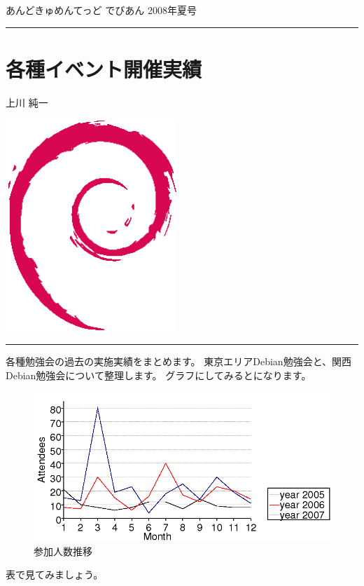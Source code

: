 \documentclass[mingoth,a4paper]{jsarticle}
\renewcommand{\dancersection}[2]{%
\newpage
あんどきゅめんてっど でびあん 2008年夏号
%
\vspace{0.1mm}\\
{\color{dancerlightblue}\rule{\hsize}{2mm}}

%
%
\begin{minipage}[t]{0.6\hsize}
\color{dancerdarkblue}
\vspace{1cm}
\section{#1}
\hfill{}#2\\
\end{minipage}
\begin{minipage}[t]{0.4\hsize}
\vspace{-2cm}
\hfill{}\includegraphics[height=8cm]{image200502/openlogo-nd.eps}\\
\vspace{-5cm}
\end{minipage}
%
%
{\color{dancerdarkblue}\rule{0.74\hsize}{2mm}}
%
\vspace{2cm}
}
\begin{document}
\dancersection{各種イベント開催実績}{上川 純一}
\label{sec:debmtg2007results}

各種勉強会の過去の実施実績をまとめます。
東京エリアDebian勉強会と、関西Debian勉強会について整理します。
グラフにしてみるとになります。
\begin{figure}[h]
 \begin{center}
  \includegraphics[width=12cm]{image200712/people-chart.png}
 \end{center}
\caption{参加人数推移}
\label{fig:peoplechart}
\end{figure}

表で見てみましょう。
 
\end{document}
